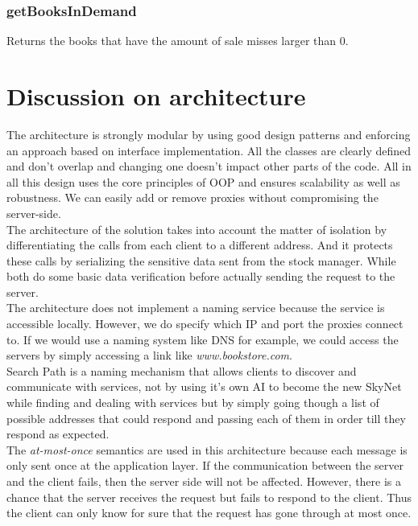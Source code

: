 \documentclass{article}      %
\begin{document}
\subsubsection*{getBooksInDemand}
Returns the books that have the amount of sale misses larger than 0.\\

\section*{Discussion on architecture}

The architecture is strongly modular by using good design patterns and enforcing an approach based on interface implementation. All the classes are clearly defined and don't overlap and changing one doesn't impact other parts of the code. All in all this design uses the core principles of OOP and ensures scalability as well as robustness. We can easily add or remove proxies without compromising the server-side.\\

The architecture of the solution takes into account the matter of isolation by differentiating the calls from each client to a different address. And it protects these calls by serializing the sensitive data sent from the stock manager. While both do some basic data verification before actually sending the request to the server.\\

The architecture does not implement a naming service because the service is accessible locally. However, we do specify which IP and port the proxies connect to. If we would use a naming system like DNS for example, we could access the servers by simply accessing a link like \emph{www.bookstore.com}.\\

Search Path is a naming mechanism that allows clients to discover and communicate with services, not by using it's own AI to become the new SkyNet while finding and dealing with services but by simply going though a list of possible addresses that could respond and passing each of them in order till they respond as expected.\\

The \emph{at-most-once} semantics are used in this architecture because each message is only sent once at the application layer. If the communication between the server and the client fails, then the server side will not be affected. However, there is a chance that the server receives the request but fails to respond to the client. Thus the client can only know for sure that the request has gone through at most once.\\
\end{document}
